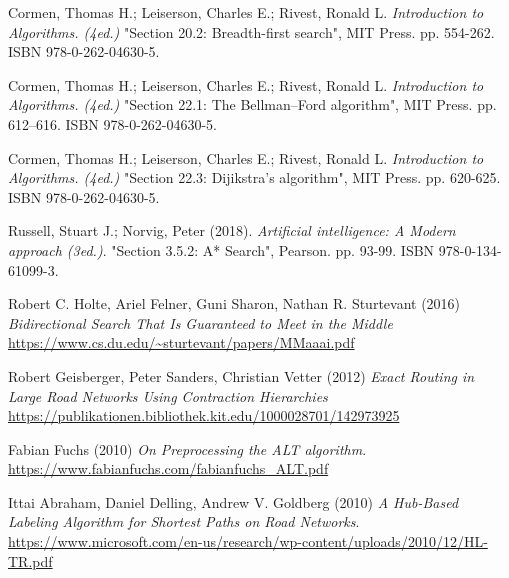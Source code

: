 \cleardoublepage
{}
{}
\begin{thebibliography}{99}
	
	
	Cormen, Thomas H.; Leiserson, Charles E.; Rivest, Ronald L. \emph{Introduction to Algorithms.  (4ed.)} "Section 20.2: Breadth-first search", MIT Press. pp. 554-262.
	ISBN 978-0-262-04630-5. 
	
	Cormen, Thomas H.; Leiserson, Charles E.; Rivest, Ronald L. \emph{Introduction to Algorithms.  (4ed.)} "Section 22.1: The Bellman–Ford algorithm", MIT Press. pp. 612–616.
	ISBN 978-0-262-04630-5.
	
	Cormen, Thomas H.; Leiserson, Charles E.; Rivest, Ronald L. \emph{Introduction to Algorithms.  (4ed.)} "Section 22.3: Dijikstra's algorithm", MIT Press. pp. 620-625.
	ISBN 978-0-262-04630-5.  
	
	Russell, Stuart J.; Norvig, Peter (2018). 
	\emph{Artificial intelligence: A Modern approach (3ed.)}. "Section 3.5.2: A* Search", Pearson. pp. 93-99. ISBN 978-0-134-61099-3.
	
	Robert C. Holte, Ariel Felner, Guni Sharon, Nathan R. Sturtevant (2016)
	\emph{Bidirectional Search That Is Guaranteed to Meet in the Middle}
	\url{https://www.cs.du.edu/~sturtevant/papers/MMaaai.pdf}
	
	Robert Geisberger, Peter Sanders, Christian Vetter (2012)
	\emph{Exact Routing in Large Road Networks Using Contraction Hierarchies}
	\url{https://publikationen.bibliothek.kit.edu/1000028701/142973925}
	
	Fabian Fuchs (2010)
	\emph{On Preprocessing the ALT algorithm}.
	\url{https://www.fabianfuchs.com/fabianfuchs_ALT.pdf}
	
	Ittai Abraham, Daniel Delling, Andrew V. Goldberg (2010)
	\emph{A Hub-Based Labeling Algorithm for Shortest Paths on Road Networks}.
	\url{https://www.microsoft.com/en-us/research/wp-content/uploads/2010/12/HL-TR.pdf}
	
	
\end{thebibliography}
